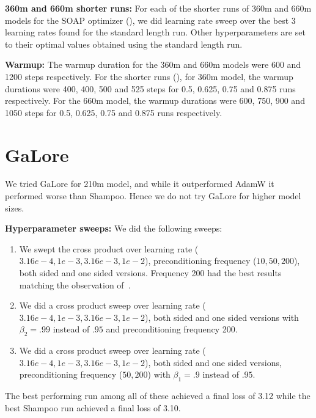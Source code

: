 \documentclass{article} %
\begin{document}
\textbf{360m and 660m shorter runs:} For each of the shorter runs of 360m and 660m models for the SOAP optimizer (), we did learning rate sweep over the best 3 learning rates found for the standard length run. Other hyperparameters are set to their optimal values obtained using the standard length run.

\textbf{Warmup:} The warmup duration for the 360m and 660m models were 600 and 1200 steps respectively. For the shorter runs (), for 360m model, the warmup durations were 400, 400, 500 and 525 steps for 0.5, 0.625, 0.75 and 0.875 runs respectively. For the 660m model, the warmup durations were 600, 750, 900 and 1050 steps for 0.5, 0.625, 0.75 and 0.875 runs respectively.



\section{GaLore}
\label{app:galore}

We tried GaLore for 210m model, and while it outperformed AdamW it performed worse than Shampoo. Hence we do not try GaLore for higher model sizes. 


\textbf{Hyperparameter sweeps:} We did the following sweeps:
\begin{enumerate}
	\item We swept the cross product over learning rate ($3.16e-4, 1e-3, 3.16e-3, 1e-2$), preconditioning frequency ($10, 50, 200$), both sided and one sided versions. Frequency 200 had the best results matching the observation of~\citet{galore}.
	\item We did a cross product sweep over learning rate ($3.16e-4, 1e-3, 3.16e-3, 1e-2$), both sided and one sided versions with $\beta_2 = .99$ instead of $.95$ and preconditioning frequency 200.
	\item We did a cross product sweep over learning rate ($3.16e-4, 1e-3, 3.16e-3, 1e-2$), both sided and one sided versions, preconditioning frequency ($50, 200$)  with $\beta_1 = .9$ instead of $.95$.
\end{enumerate}  


The best performing run among all of these achieved a final loss of 3.12 while the best Shampoo run achieved a final loss of 3.10. 
\end{document}

